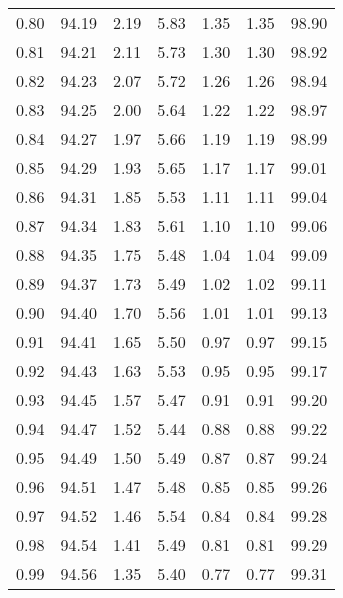 \begin{tabular}{|c|c|c|c|c|c|c|}
      0.80 &     94.19 &      2.19 &       5.83 &    1.35 &       1.35 &         98.90 \\
      0.81 &     94.21 &      2.11 &       5.73 &    1.30 &       1.30 &         98.92 \\
      0.82 &     94.23 &      2.07 &       5.72 &    1.26 &       1.26 &         98.94 \\
      0.83 &     94.25 &      2.00 &       5.64 &    1.22 &       1.22 &         98.97 \\
      0.84 &     94.27 &      1.97 &       5.66 &    1.19 &       1.19 &         98.99 \\
      0.85 &     94.29 &      1.93 &       5.65 &    1.17 &       1.17 &         99.01 \\
      0.86 &     94.31 &      1.85 &       5.53 &    1.11 &       1.11 &         99.04 \\
      0.87 &     94.34 &      1.83 &       5.61 &    1.10 &       1.10 &         99.06 \\
      0.88 &     94.35 &      1.75 &       5.48 &    1.04 &       1.04 &         99.09 \\
      0.89 &     94.37 &      1.73 &       5.49 &    1.02 &       1.02 &         99.11 \\
      0.90 &     94.40 &      1.70 &       5.56 &    1.01 &       1.01 &         99.13 \\
      0.91 &     94.41 &      1.65 &       5.50 &    0.97 &       0.97 &         99.15 \\
      0.92 &     94.43 &      1.63 &       5.53 &    0.95 &       0.95 &         99.17 \\
      0.93 &     94.45 &      1.57 &       5.47 &    0.91 &       0.91 &         99.20 \\
      0.94 &     94.47 &      1.52 &       5.44 &    0.88 &       0.88 &         99.22 \\
      0.95 &     94.49 &      1.50 &       5.49 &    0.87 &       0.87 &         99.24 \\
      0.96 &     94.51 &      1.47 &       5.48 &    0.85 &       0.85 &         99.26 \\
      0.97 &     94.52 &      1.46 &       5.54 &    0.84 &       0.84 &         99.28 \\
      0.98 &     94.54 &      1.41 &       5.49 &    0.81 &       0.81 &         99.29 \\
      0.99 &     94.56 &      1.35 &       5.40 &    0.77 &       0.77 &         99.31 \\
\bottomrule
\end{tabular}
